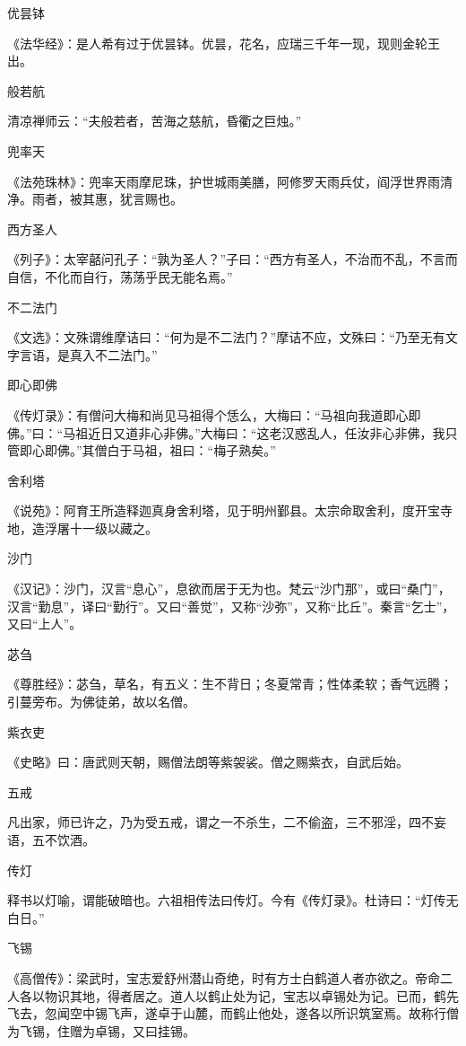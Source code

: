 \documentclass[a4paper,12pt,UTF8,twoside]{ctexbook}
\begin{document}
    优昙钵
    
    《法华经》：是人希有过于优昙钵。优昙，花名，应瑞三千年一现，现则金轮王出。
    
    般若航
    
    清凉禅师云：“夫般若者，苦海之慈航，昏衢之巨烛。”
    
    兜率天
    
    《法苑珠林》：兜率天雨摩尼珠，护世城雨美膳，阿修罗天雨兵仗，阎浮世界雨清净。雨者，被其惠，犹言赐也。
    
    西方圣人
    
    《列子》：太宰嚭问孔子：“孰为圣人？”子曰：“西方有圣人，不治而不乱，不言而自信，不化而自行，荡荡乎民无能名焉。”
    
    不二法门
    
    《文选》：文殊谓维摩诘曰：“何为是不二法门？”摩诘不应，文殊曰：“乃至无有文字言语，是真入不二法门。”
    
    即心即佛
    
    《传灯录》：有僧问大梅和尚见马祖得个恁么，大梅曰：“马祖向我道即心即佛。”曰：“马祖近日又道非心非佛。”大梅曰：“这老汉惑乱人，任汝非心非佛，我只管即心即佛。”其僧白于马祖，祖曰：“梅子熟矣。”
    
    舍利塔
    
    《说苑》：阿育王所造释迦真身舍利塔，见于明州鄞县。太宗命取舍利，度开宝寺地，造浮屠十一级以藏之。
    
    沙门
    
    《汉记》：沙门，汉言“息心”，息欲而居于无为也。梵云“沙门那”，或曰“桑门”，汉言“勤息”，译曰“勤行”。又曰“善觉”，又称“沙弥”，又称“比丘”。秦言“乞士”，又曰“上人”。
    
    苾刍
    
    《尊胜经》：苾刍，草名，有五义：生不背日；冬夏常青；性体柔软；香气远腾；引蔓旁布。为佛徒弟，故以名僧。
    
    紫衣吏
    
    《史略》曰：唐武则天朝，赐僧法朗等紫袈裟。僧之赐紫衣，自武后始。
    
    五戒
    
    凡出家，师已许之，乃为受五戒，谓之一不杀生，二不偷盗，三不邪淫，四不妄语，五不饮酒。
    
    传灯
    
    释书以灯喻，谓能破暗也。六祖相传法曰传灯。今有《传灯录》。杜诗曰：“灯传无白日。”
    
    飞锡
    
    《高僧传》：梁武时，宝志爱舒州潜山奇绝，时有方士白鹤道人者亦欲之。帝命二人各以物识其地，得者居之。道人以鹤止处为记，宝志以卓锡处为记。已而，鹤先飞去，忽闻空中锡飞声，遂卓于山麓，而鹤止他处，遂各以所识筑室焉。故称行僧为飞锡，住赠为卓锡，又曰挂锡。
    
\end{document}
